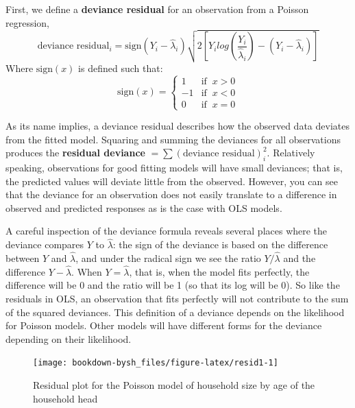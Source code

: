 \documentclass[
]{krantz}
\begin{document}
First, we define a \textbf{deviance residual} for an observation from a Poisson regression,
\begin{equation}
\textrm{deviance residual}_i = \textrm{sign}(Y_i-\hat{\lambda}_i)
\sqrt{
2 \left[Y_i log\left(\frac{Y_i}{\hat{\lambda}_i}\right)
-(Y_i - \hat{\lambda}_i) \right]}
\label{eq:deviance}
\end{equation}
Where \(\textrm{sign}(x)\) is defined such that:
\[ \textrm{sign}(x) = \begin{cases} 1  & \textrm{if }\ x > 0 \\
                                    -1 & \textrm{if }\ x < 0  \\
                                    0  & \textrm{if }\ x = 0\end{cases}\]

As its name implies, a deviance residual describes how the observed data deviates from the fitted model. Squaring and summing the deviances for all observations produces the \textbf{residual deviance} \(=\sum (\textrm{deviance residual})^2_i\). Relatively speaking, observations for good fitting models will have small deviances; that is, the predicted values will deviate little from the observed. However, you can see that the deviance for an observation does not easily translate to a difference in observed and predicted responses as is the case with OLS models.

A careful inspection of the deviance formula reveals several places where the deviance compares \(Y\) to \(\hat{\lambda}\): the sign of the deviance is based on the difference between \(Y\) and \(\hat{\lambda}\), and under the radical sign we see the ratio \(Y/\hat{\lambda}\) and the difference \(Y -\hat{\lambda}\). When \(Y = \hat{\lambda}\), that is, when the model fits perfectly, the difference will be 0 and the ratio will be 1 (so that its log will be 0). So like the residuals in OLS, an observation that fits perfectly will not contribute to the sum of the squared deviances. This definition of a deviance depends on the likelihood for Poisson models. Other models will have different forms for the deviance depending on their likelihood.

\begin{figure}

{\centering \texttt{[image: bookdown-bysh\_files/figure-latex/resid1-1]} 

}

\caption{Residual plot for the Poisson model of household size by age of the household head}\label{fig:resid1}
\end{figure}
\end{document}
